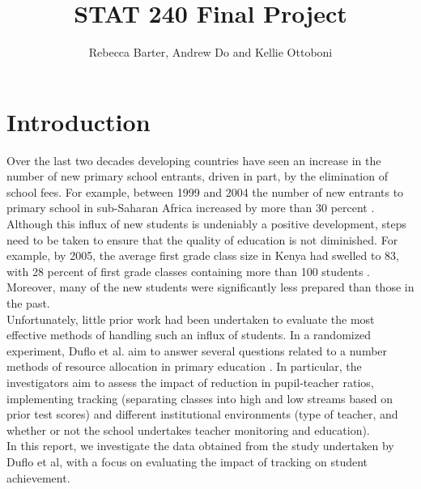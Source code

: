 \documentclass[11pt]{article}
\title{STAT 240 Final Project}
\author{Rebecca Barter, Andrew Do and Kellie Ottoboni}
\begin{document}
\maketitle

 \section{Introduction}
Over the last two decades developing countries have seen an increase in the number of new primary school entrants, driven in part, by the elimination of school fees. For example, between 1999 and 2004 the number of new entrants to primary school in sub-Saharan Africa increased by more than 30 percent \cite{unesco2007}. Although this influx of new students is undeniably a positive development, steps need to be taken to ensure that the quality of education is not diminished. For example, by 2005, the average first grade class size in Kenya had swelled to 83, with 28 percent of first grade classes containing more than 100 students \cite{duflo2007}. Moreover, many of the new students were significantly less prepared than those in the past.\\

Unfortunately, little prior work had been undertaken to evaluate the most effective methods of handling such an influx of students. In a randomized experiment, Duflo et al. aim to answer several questions related to a number methods of resource allocation in primary education \cite{duflo2011}. In particular, the investigators aim to assess the impact of reduction in pupil-teacher ratios, implementing tracking (separating classes into high and low streams based on prior test scores) and different institutional environments (type of teacher, and whether or not the school undertakes teacher monitoring and education).\\

In this report, we investigate the data obtained from the study undertaken by Duflo et al, with a focus on evaluating the impact of tracking on student achievement. 
 
\end{document}
